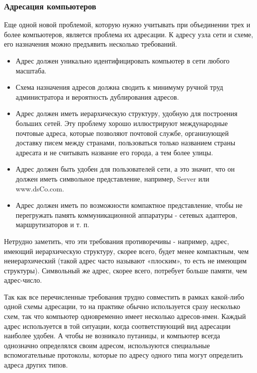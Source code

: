 \subsubsection{Адресация компьютеров}

Еще одной новой проблемой, которую нужно учитывать при объединении трех и более компьютеров, является проблема их адресации.
К адресу узла сети и схеме, его назначения можно предъявить несколько требований.
\begin{itemize}
    \item Адрес должен уникально идентифицировать компьютер в сети любого масштаба.
    \item Схема назначения адресов должна сводить к минимуму ручной труд администратора и вероятность дублирования адресов.
    \item Адрес должен иметь иерархическую структуру, удобную для построения больших сетей.
        Эту проблему хорошо иллюстрируют международные почтовые адреса, которые позволяют почтовой службе, организующей доставку писем между странами, пользоваться только названием страны адресата и не считывать название его города, а тем более улицы.
    \item Адрес должен быть удобен для пользователей сети, а это значит, что он должен иметь символьное представление, например, Server или www.dsCo.com.
    \item Адрес должен иметь по возможности компактное представление, чтобы не перегружать память коммуникационной аппаратуры - сетевых адаптеров,  маршрутизаторов и т. п.
\end{itemize}

Нетрудно заметить, что эти требования противоречивы - например, адрес, имеющий иерархическую структуру, скорее всего, будет менее компактным, чем неиерархический (такой адрес часто называют «плоским», то есть не имеющим структуры).
Символьный же адрес, скорее всего, потребует больше памяти, чем адрес-число.

Так как все перечисленные требования трудно совместить в рамках какой-либо одной схемы адресации, то на практике обычно используется сразу несколько схем, так что компьютер одновременно имеет несколько адресов-имен.
Каждый адрес используется в той ситуации, когда соответствующий вид адресации наиболее удобен.
А чтобы не возникало путаницы, и компьютер всегда однозначно определялся своим адресом, используются специальные вспомогательные протоколы, которые по адресу одного типа могут определить адреса других типов.

